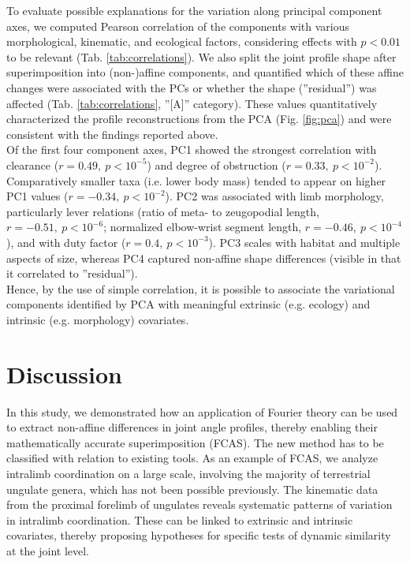 To evaluate possible explanations for the variation along principal component axes, we computed Pearson correlation of the components with various morphological, kinematic, and ecological factors, considering effects with $p<0.01$ to be relevant (Tab. \ref{tab:correlations}).
We also split the joint profile shape after superimposition into (non-)affine components, and quantified which of these affine changes were associated with the PCs or whether the shape (''residual'') was affected (Tab. \ref{tab:correlations}, ''[A]'' category).
These values quantitatively characterized the profile reconstructions from the PCA (Fig. \ref{fig:pca}) and were consistent with the findings reported above.
\\Of the first four component axes, PC1 showed the strongest correlation with clearance ($r = 0.49,\ p < 10^{-5}$) and degree of obstruction ($r = 0.33,\ p < 10^{-2}$).
Comparatively smaller taxa (i.e. lower body mass) tended to appear on higher PC1 values ($r = -0.34,\ p < 10^{-2}$).
PC2 was associated with limb morphology, particularly lever relations (ratio of meta- to zeugopodial length, $r = -0.51,\ p < 10^{-6}$; normalized elbow-wrist segment length, $r = -0.46,\ p < 10^{-4}$), and with duty factor ($r = 0.4,\ p < 10^{-3}$).
PC3 scales with habitat and multiple aspects of size, whereas PC4 captured non-affine shape differences (visible in that it correlated to ''residual'').
\\Hence, by the use of simple correlation, it is possible to associate the variational components identified by PCA with meaningful extrinsic (e.g. ecology) and intrinsic (e.g. morphology) covariates.



\FloatBarrier\pagebreak
\section{Discussion}
In this study, we demonstrated how an application of Fourier theory can be used to extract non-affine differences in joint angle profiles, thereby enabling their mathematically accurate superimposition (FCAS).
The new method has to be classified with relation to existing tools.
As an example of FCAS, we analyze intralimb coordination on a large scale, involving the majority of terrestrial ungulate genera, which has not been possible previously.
The kinematic data from the proximal forelimb of ungulates reveals systematic patterns of variation in intralimb coordination.
These can be linked to extrinsic and intrinsic covariates, thereby proposing hypotheses for specific tests of dynamic similarity at the joint level.


